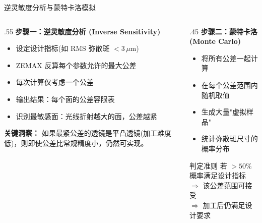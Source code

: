 \begin{frame}{逆灵敏度分析与蒙特卡洛模拟}
    \begin{columns}[T]
        \begin{column}{.55\textwidth}
            \textbf{步骤一：逆灵敏度分析 (Inverse Sensitivity)}
            \begin{itemize}
                \item 设定设计指标(如 RMS 弥散斑 $< 3\,\mu\text{m}$)
                \item ZEMAX \alert{反算每个参数允许的最大公差}
                \item 每次计算仅考虑\alert{一个公差}
                \item 输出结果：每个面的公差容限表
                \item 识别最敏感面：\alert{光线折射越大的面，公差越紧}
            \end{itemize}

            \bigbreak
            \textbf{关键洞察：}
            如果最紧公差的透镜是\alert{平凸透镜}(加工难度低)，则即使公差比常规精度小，仍然可实现。
        \end{column}
        \hfill
        \begin{column}{.45\textwidth}
            \textbf{步骤二：蒙特卡洛 (Monte Carlo)}
            \begin{itemize}
                \item 将所有公差\alert{一起}计算
                \item 在每个公差范围内随机取值
                \item 生成大量"虚拟样品"
                \item 统计弥散斑尺寸的概率分布
            \end{itemize}

            \begin{block}{判定准则}
                \alert{若 $>50\%$ 概率满足设计指标}\\
                $\Longrightarrow$ 该公差范围可接受\\
                $\Longrightarrow$ 加工后仍满足设计要求
            \end{block}
        \end{column}
    \end{columns}
\end{frame}


